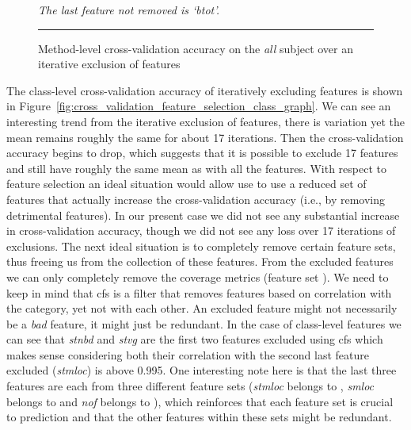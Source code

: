 \begin{figure}[ht!]
  \centering
  \begin{adjustbox}{max size={.95\textwidth}{.95\textheight}}
    
  \end{adjustbox}
  \caption{Method-level cross-validation accuracy on the \emph{all} subject over an iterative exclusion of features}
  \vspace{1mm}
  \footnotesize{\emph{The last feature not removed is `btot'.}}
  \vspace{2mm}
  \hrule
  \label{fig:cross_validation_feature_selection_method_graph}
\end{figure}

The class-level cross-validation accuracy of iteratively excluding features is shown in Figure~\ref{fig:cross_validation_feature_selection_class_graph}. We can see an interesting trend from the iterative exclusion of features, there is variation yet the mean remains roughly the same for about 17 iterations. Then the cross-validation accuracy begins to drop, which suggests that it is possible to exclude 17 features and still have roughly the same mean as with all the features. With respect to feature selection an ideal situation would allow use to use a reduced set of features that actually increase the cross-validation accuracy (i.e., by removing detrimental features). In our present case we did not see any substantial increase in cross-validation accuracy, though we did not see any loss over 17 iterations of exclusions. The next ideal situation is to completely remove certain feature sets, thus freeing us from the collection of these features. From the excluded features we can only completely remove the coverage metrics (feature set ). We need to keep in mind that \gls{cfs} is a filter that removes features based on correlation with the category, yet not with each other. An excluded feature might not necessarily be a \emph{bad} feature, it might just be redundant. In the case of class-level features we can see that \emph{stnbd} and \emph{stvg} are the first two features excluded using \gls{cfs} which makes sense considering both their correlation with the second last feature excluded (\emph{stmloc}) is above 0.995. One interesting note here is that the last three features are each from three different feature sets (\emph{stmloc} belongs to , \emph{smloc} belongs to  and \emph{nof} belongs to ), which reinforces that each feature set is crucial to prediction and that the other features within these sets might be redundant.

